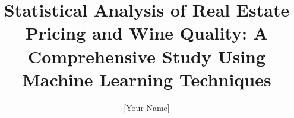 \documentclass[10pt, twocolumn]{IEEEtran}
\begin{document}
\title{Statistical Analysis of Real Estate Pricing and Wine Quality: A Comprehensive Study Using Machine Learning Techniques}

\author{[Your Name]\\
\\
[Your University]
}

\maketitle










\end{document}
